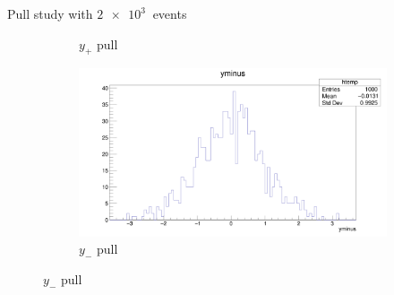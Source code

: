 \documentclass{beamer}
\begin{document}
\begin{frame}{Pull study with $\SI{2e3}{}$ events}
\begin{figure}
\begin{subfigure}{0.5\textwidth}
      \caption{$y_+$ pull}
    \end{subfigure}%
    \begin{subfigure}{0.5\textwidth}
      \includegraphics[width = 1.0\textwidth]{yminus1K1K.png}
      \caption{$y_-$ pull}
    \end{subfigure}
  \end{figure}
\end{frame}
\end{document}
